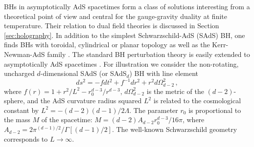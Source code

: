 \documentclass[]{iopart}
\def\be{\begin{equation}}
\def\ee{\end{equation}}
\begin{document}
BHs in asymptotically AdS spacetimes form a class of solutions interesting
from a theoretical point of view and central for the gauge-gravity duality at
finite temperature.  Their relation to dual field theories is discussed in
Section \ref{sec:holography}.  In addition to the simplest Schwarzschild-AdS
(SAdS) BH, one finds BHs with toroidal, cylindrical or planar topology
\cite{Lemos:1994fn,Lemos:1994xp,Lemos:1995cm,Mann:1996gj,Vanzo:1997gw,
  Birmingham:1998nr} as well as the Kerr-Newman-AdS family
\cite{Carter:1968ks}.  The standard BH perturbation theory \cite{MTB} is
easily extended to asymptotically AdS spacetimes
\cite{Kodama:2003jz,Mellor:1989ac,Cardoso:2001bb,Cardoso:2001vs}.  For
illustration we consider the non-rotating, uncharged $d$-dimensional SAdS (or
SAdS$_d$) BH with line element
%
\be ds^{2}= -fdt^{2}+f^{-1}dr^{2}+r^{2}d\Omega_{d-2}^2\,,
\label{lineelementads} \ee
%
where $f(r) = 1 + r^2/L^2 - r_0^{d-3}/r^{d-3}$, $d\Omega_{d-2}^2$ is the
metric of the $(d-2)$-sphere, and the AdS curvature radius squared $L^2$ is
related to the cosmological constant by $L^2 = -(d-2)(d-1)/2\Lambda$. The
parameter $r_0$ is proportional to the mass $M$ of the spacetime:
%
$M=(d-2)A_{d-2}r_0^{d-3}/16\pi$,
%
where $A_{d-2} = 2 \pi^{(d-1)/2}/\Gamma{\left[(d-1)/2\right]}$.  The
well-known Schwarzschild geometry corresponds to $L\to \infty$.
\end{document}
